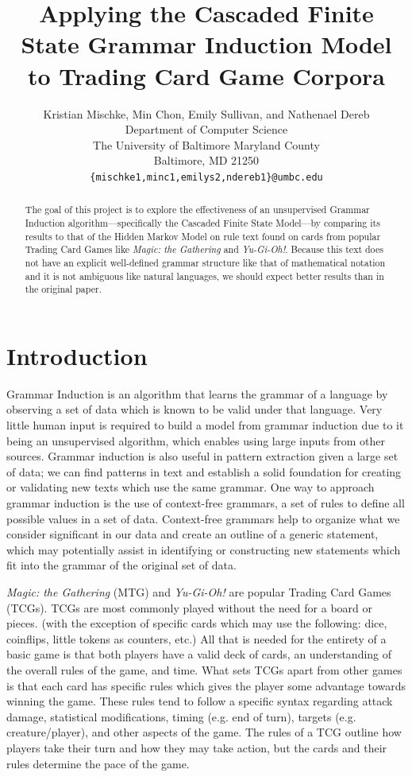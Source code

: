 \documentclass[11pt,a4paper]{article}
\title{Applying the Cascaded Finite State Grammar Induction Model to Trading Card Game Corpora}
\author{Kristian Mischke, Min Chon, Emily Sullivan, and Nathenael Dereb \\
  Department of Computer Science \\
  The University of Baltimore Maryland County \\
  Baltimore, MD 21250 \\
  \texttt{\{mischke1,minc1,emilys2,ndereb1\}@umbc.edu} \\}
\date{}
\begin{document}
\maketitle
\begin{abstract}
The goal of this project is to explore the effectiveness of an unsupervised Grammar Induction algorithm—specifically the Cascaded Finite State Model—by comparing its results to that of the Hidden Markov Model on rule text found on cards from popular Trading Card Games like \emph{Magic: the Gathering} and \emph{Yu-Gi-Oh!}.
Because this text does not have an explicit well-defined grammar structure like that of mathematical notation and it is not ambiguous like natural languages, we should expect better results than in the original paper.

\end{abstract}

\section{Introduction}
Grammar Induction is an algorithm that learns the grammar of a language by observing a set of data which is known to be valid under that language.
Very little human input is required to build a model from grammar induction due to it being an unsupervised algorithm, which enables using large inputs from other sources.
Grammar induction is also useful in pattern extraction given a large set of data; we can find patterns in text and establish a solid foundation for creating or validating new texts which use the same grammar.
One way to approach grammar induction is the use of context-free grammars, a set of rules to define all possible values in a set of data.
Context-free grammars help to organize what we consider significant in our data and create an outline of a generic statement, which may potentially assist in identifying or constructing new statements which fit into the grammar of the original set of data.

\emph{Magic: the Gathering} (MTG) and \emph{Yu-Gi-Oh!} are popular Trading Card Games (TCGs).
TCGs are most commonly played without the need for a board or pieces. (with the exception of specific cards which may use the following: dice, coinflips, little tokens as counters, etc.)
All that is needed for the entirety of a basic game is that both players have a valid deck of cards, an understanding of the overall rules of the game, and time.
What sets TCGs apart from other games is that each card has specific rules which gives the player some advantage towards winning the game.
These rules tend to follow a specific syntax regarding attack damage, statistical modifications, timing (e.g. end of turn), targets (e.g. creature/player), and other aspects of the game.
The rules of a TCG outline how players take their turn and how they may take action, but the cards and their rules determine the pace of the game.
\end{document}
